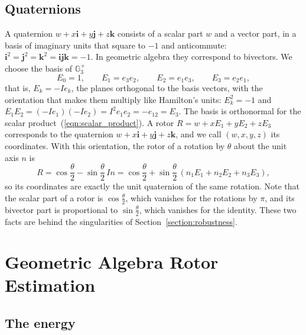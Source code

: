 \documentclass{birkjour}
\theoremstyle{definition}
\theoremstyle{remark}
\numberwithin{equation}{section}
\newcommand{\Ge}{\mathbb{G}}
\begin{document}
\subsection{Quaternions}

A quaternion $w + x \mathbf{i} + y \mathbf{j} + z \mathbf{k}$ consists of a scalar part $w$ and a vector part, in a basis of imaginary units that square to $-1$ and anticommute: $\mathbf{i}^2 = \mathbf{j}^2 = \mathbf{k}^2 = \mathbf{i} \mathbf{j} \mathbf{k} = -1$. In geometric algebra they correspond to bivectors. We choose the basis of $\Ge_3^+$
\begin{equation}
\label{eqn:basis}
E_0 = 1, \qquad E_1 = e_3 e_2, \qquad E_2 = e_1 e_3, \qquad E_3 = e_2 e_1,
\end{equation}
that is, $E_k = -I e_k$, the planes orthogonal to the basis vectors, with the orientation that makes them multiply like Hamilton's units: $E_k^2 = -1$ and $E_1 E_2 = (-I e_1)(-I e_2) = I^2 e_1 e_2 = -e_{12} = E_3$. The basis is orthonormal for the scalar product~(\ref{eqn:scalar_product}). A rotor $R = w + x E_1 + y E_2 + z E_3$ corresponds to the quaternion $w + x \mathbf{i} + y \mathbf{j} + z \mathbf{k}$, and we call $(w, x, y, z)$ its coordinates. With this orientation, the rotor of a rotation by $\theta$ about the unit axis $n$ is \cite{Doran2003}
\begin{equation}
\label{eqn:rotor_axis_angle}
R = \cos\frac{\theta}{2} - \sin\frac{\theta}{2}\, I n = \cos\frac{\theta}{2} + \sin\frac{\theta}{2}\,(n_1 E_1 + n_2 E_2 + n_3 E_3),
\end{equation}
so its coordinates are exactly the unit quaternion of the same rotation. Note that the scalar part of a rotor is $\cos\frac{\theta}{2}$, which vanishes for the rotations by $\pi$, and its bivector part is proportional to $\sin\frac{\theta}{2}$, which vanishes for the identity. These two facts are behind the singularities of Section~\ref{section:robustness}.

\section{Geometric Algebra Rotor Estimation}
\label{section:estimation}

\subsection{The energy}
\end{document}
